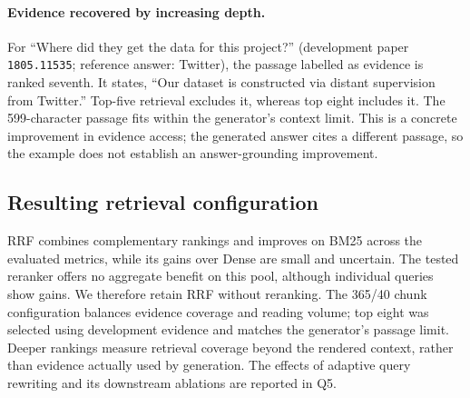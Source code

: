 \paragraph{Evidence recovered by increasing depth.} For ``Where did they get the data for this project?'' (development paper \texttt{1805.11535}; reference answer: Twitter), the passage labelled as evidence is ranked seventh. It states, ``Our dataset is constructed via distant supervision from Twitter.'' Top-five retrieval excludes it, whereas top eight includes it. The 599-character passage fits within the generator's context limit. This is a concrete improvement in evidence access; the generated answer cites a different passage, so the example does not establish an answer-grounding improvement.

\subsection{Resulting retrieval configuration}
RRF combines complementary rankings and improves on BM25 across the evaluated metrics, while its gains over Dense are small and uncertain. The tested reranker offers no aggregate benefit on this pool, although individual queries show gains. We therefore retain RRF without reranking. The 365/40 chunk configuration balances evidence coverage and reading volume; top eight was selected using development evidence and matches the generator's passage limit. Deeper rankings measure retrieval coverage beyond the rendered context, rather than evidence actually used by generation. The effects of adaptive query rewriting and its downstream ablations are reported in Q5.

% 
